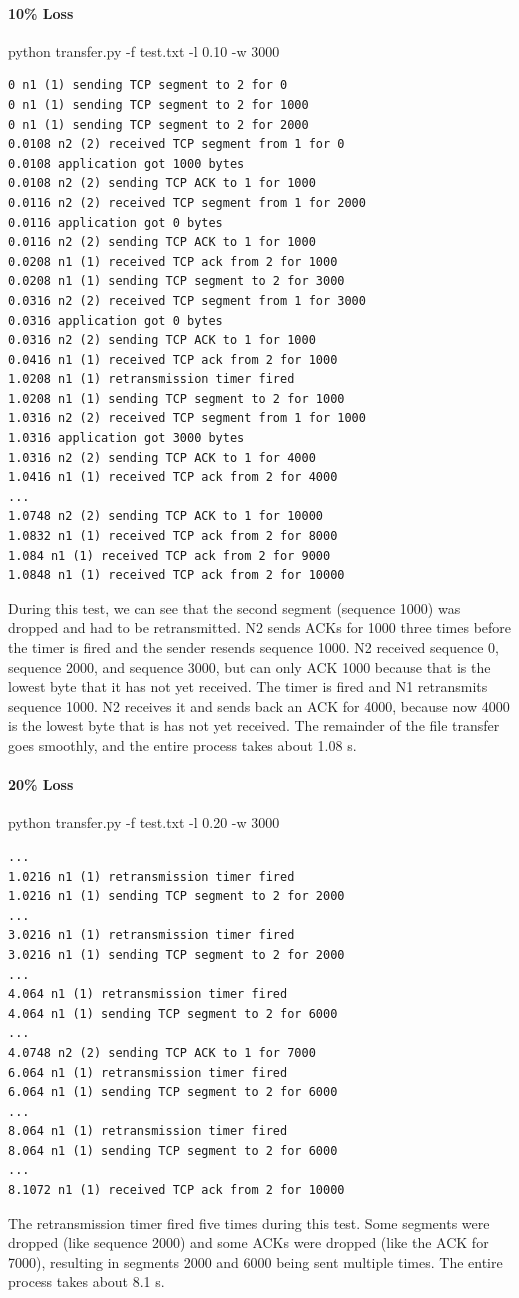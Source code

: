 \documentclass[11pt]{article}
\begin{document}
\paragraph{10\% Loss}
python transfer.py -f test.txt -l 0.10 -w 3000
\begin{lstlisting}
0 n1 (1) sending TCP segment to 2 for 0
0 n1 (1) sending TCP segment to 2 for 1000
0 n1 (1) sending TCP segment to 2 for 2000
0.0108 n2 (2) received TCP segment from 1 for 0
0.0108 application got 1000 bytes
0.0108 n2 (2) sending TCP ACK to 1 for 1000
0.0116 n2 (2) received TCP segment from 1 for 2000
0.0116 application got 0 bytes
0.0116 n2 (2) sending TCP ACK to 1 for 1000
0.0208 n1 (1) received TCP ack from 2 for 1000
0.0208 n1 (1) sending TCP segment to 2 for 3000
0.0316 n2 (2) received TCP segment from 1 for 3000
0.0316 application got 0 bytes
0.0316 n2 (2) sending TCP ACK to 1 for 1000
0.0416 n1 (1) received TCP ack from 2 for 1000
1.0208 n1 (1) retransmission timer fired
1.0208 n1 (1) sending TCP segment to 2 for 1000
1.0316 n2 (2) received TCP segment from 1 for 1000
1.0316 application got 3000 bytes
1.0316 n2 (2) sending TCP ACK to 1 for 4000
1.0416 n1 (1) received TCP ack from 2 for 4000
...
1.0748 n2 (2) sending TCP ACK to 1 for 10000
1.0832 n1 (1) received TCP ack from 2 for 8000
1.084 n1 (1) received TCP ack from 2 for 9000
1.0848 n1 (1) received TCP ack from 2 for 10000
\end{lstlisting}
During this test, we can see that the second segment (sequence 1000) was dropped and had to be retransmitted. N2 sends ACKs for 1000 three times before the timer is fired and the sender resends sequence 1000. N2 received sequence 0, sequence 2000, and sequence 3000, but can only ACK 1000 because that is the lowest byte that it has not yet received. The timer is fired and N1 retransmits sequence 1000. N2 receives it and sends back an ACK for 4000, because now 4000 is the lowest byte that is has not yet received. The remainder of the file transfer goes smoothly, and the entire process takes about 1.08 s.
\paragraph{20\% Loss}
python transfer.py -f test.txt -l 0.20 -w 3000
\begin{lstlisting}
...
1.0216 n1 (1) retransmission timer fired
1.0216 n1 (1) sending TCP segment to 2 for 2000
...
3.0216 n1 (1) retransmission timer fired
3.0216 n1 (1) sending TCP segment to 2 for 2000
...
4.064 n1 (1) retransmission timer fired
4.064 n1 (1) sending TCP segment to 2 for 6000
...
4.0748 n2 (2) sending TCP ACK to 1 for 7000
6.064 n1 (1) retransmission timer fired
6.064 n1 (1) sending TCP segment to 2 for 6000
...
8.064 n1 (1) retransmission timer fired
8.064 n1 (1) sending TCP segment to 2 for 6000
...
8.1072 n1 (1) received TCP ack from 2 for 10000
\end{lstlisting}
The retransmission timer fired five times during this test. Some segments were dropped (like sequence 2000) and some ACKs were dropped (like the ACK for 7000), resulting in segments 2000 and 6000 being sent multiple times. The entire process takes about 8.1 s.
\end{document}
